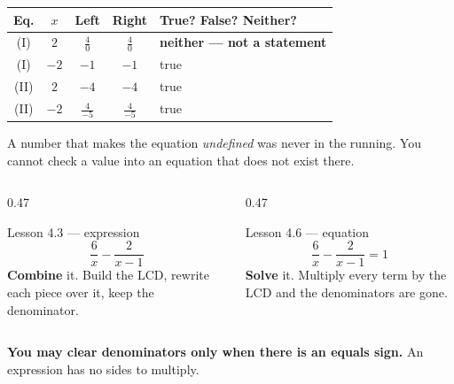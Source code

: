 \documentclass[aspectratio=169, 11pt]{beamer}
\begin{document}
\begin{frame}[t, plain]
  \centering
  \renewcommand{\arraystretch}{1.5}
  \begin{tabular}{|c|c|c|c|l|}
  \hline
  \textbf{Eq.} & \textbf{$x$} & \textbf{Left} & \textbf{Right} & \textbf{True? False? Neither?} \\ \hline
  (I)  & $2$  & $\frac40$ & $\frac40$ & \textbf{neither --- not a statement} \\ \hline
  (I)  & $-2$ & $-1$ & $-1$ & true \\ \hline
  (II) & $2$  & $-4$ & $-4$ & true \\ \hline
  (II) & $-2$ & $\frac{4}{-5}$ & $\frac{4}{-5}$ & true \\ \hline
  \end{tabular}

  \vspace{8pt}
  \begin{block}{}
    \centering A number that makes the equation \emph{undefined} was never in the running.
    You cannot check a value into an equation that does not exist there.
  \end{block}
\end{frame}

\begin{frame}[t, plain]
  \begin{columns}[T]
    \begin{column}{0.47\textwidth}
      \begin{block}{Lesson 4.3 --- expression}
        \[ \frac{6}{x}-\frac{2}{x-1} \]
        \textbf{Combine} it. Build the LCD, rewrite each piece over it, keep the denominator.
      \end{block}
    \end{column}
    \begin{column}{0.47\textwidth}
      \begin{block}{Lesson 4.6 --- equation}
        \[ \frac{6}{x}-\frac{2}{x-1}=1 \]
        \textbf{Solve} it. Multiply every term by the LCD and the denominators are gone.
      \end{block}
    \end{column}
  \end{columns}
  \vspace{8pt}
  \begin{block}{}
    \centering\textbf{You may clear denominators only when there is an equals sign.}
    An expression has no sides to multiply.
  \end{block}
\end{frame}
\end{document}
